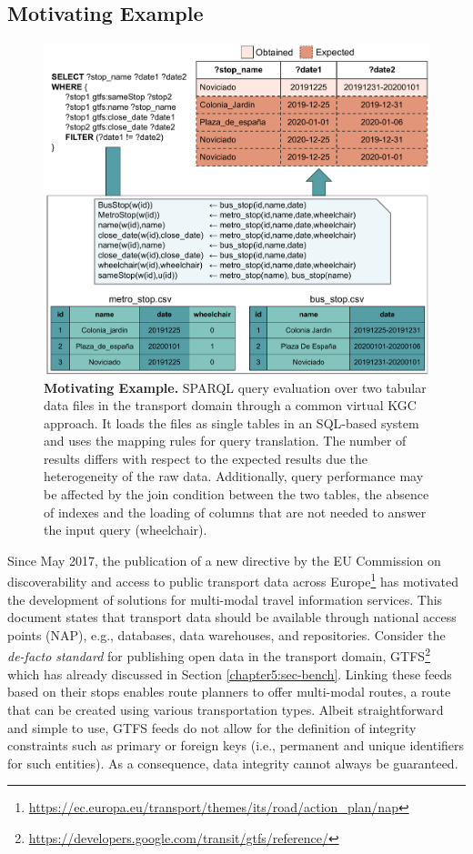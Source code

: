 \subsection{Motivating Example}
\begin{figure}[th]
    \centering
    \includegraphics[width=0.6\linewidth]{figures/example.pdf}
    \caption[Morph-CSV motivating example]{\textbf{Motivating Example.} SPARQL query evaluation over two tabular data files in the transport domain through a common virtual KGC approach. It loads the files as single tables in an SQL-based system and uses the mapping rules for query translation. The number of results differs with respect to the expected results due the heterogeneity of the raw data. Additionally, query performance may be affected by the join condition between the two tables, the absence of indexes and the loading of columns that are not needed to answer the input query (wheelchair).}
    \label{fig:example}
\end{figure}
Since May 2017, the publication of a new directive by the EU Commission on discoverability and access to public transport data across Europe\footnote{\url{https://ec.europa.eu/transport/themes/its/road/action_plan/nap}} has motivated the development of solutions for multi-modal travel information services. This document states that transport data should be available through national access points (NAP), e.g., databases, data warehouses, and repositories. Consider the \emph{de-facto standard} for publishing open data in the transport domain, GTFS\footnote{\url{https://developers.google.com/transit/gtfs/reference/}} which has already discussed in Section \ref{chapter5:sec-bench}. Linking these feeds based on their stops enables route planners to offer multi-modal routes, a route that can be created using various transportation types.
Albeit straightforward and simple to use, GTFS feeds do not allow for the definition of integrity constraints such as primary or foreign keys (i.e., permanent and unique identifiers for such entities). As a consequence, data integrity cannot always be guaranteed. 

